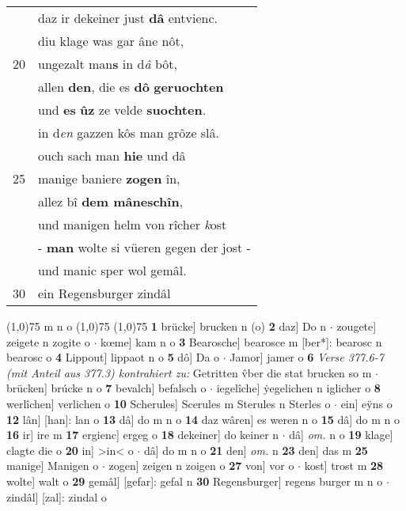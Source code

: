 \documentclass[8pt,a4paper,notitlepage]{article}
\begin{document}
\begin{table}[ht]
\begin{minipage}[t]{0.5\linewidth}
\begin{tabular}{rl}
 & daz ir dekeiner just \textbf{dâ} entvienc.\\ 
 & diu klage was gar âne nôt,\\ 
20 & ungezalt man\textbf{s} in d\textit{â} bôt,\\ 
 & allen \textbf{den}, die es \textbf{dô} \textbf{geruochten}\\ 
 & und \textbf{es} \textbf{ûz} ze velde \textbf{suochten}.\\ 
 & in d\textit{en} gazzen kôs man grôze slâ.\\ 
 & ouch sach man \textbf{hie} und dâ\\ 
25 & manige baniere \textbf{zogen} în,\\ 
 & allez bî \textbf{dem mâneschîn},\\ 
 & und manigen helm von rîcher \textit{k}ost\\ 
 & - \textbf{man} wolte si vüeren gegen der jost -\\ 
 & und manic sper wol gemâl.\\ 
30 & ein Regensburger zindâl\\ 
\end{tabular}
\scriptsize
\line(1,0){75} \newline
m n o \newline
\line(1,0){75} \newline
\newline
\line(1,0){75} \newline
\textbf{1} brücke] brucken n (o) \textbf{2} daz] Do n  $\cdot$ zougete] zeigete n zogite o  $\cdot$ kœme] kam n o \textbf{3} Bearosche] bearosce m [ber*]: bearosc n bearosc o \textbf{4} Lippout] lippaot n o \textbf{5} dô] Da o  $\cdot$ Jamor] jamer o \textbf{6} \textit{Verse 377.6-7 (mit Anteil aus 377.3) kontrahiert zu:} Getritten v̂ber die stat brucken so m   $\cdot$ brücken] brúcke n o \textbf{7} bevalch] befalsch o  $\cdot$ iegelîche] ẏegelichen n iglicher o \textbf{8} werlîchen] verlichen o \textbf{10} Scherules] Scerules m Sterules n Sterles o  $\cdot$ ein] eÿns o \textbf{12} lân] [han]: lan o \textbf{13} dâ] do m n o \textbf{14} daz wâren] es weren n o \textbf{15} dâ] do m n o \textbf{16} ir] ire m \textbf{17} ergienc] ergeg o \textbf{18} dekeiner] do keiner n  $\cdot$ dâ] \textit{om.} n o \textbf{19} klage] clagte die o \textbf{20} in] >in< o  $\cdot$ dâ] do m n o \textbf{21} den] \textit{om.} n \textbf{23} den] das m \textbf{25} manige] Manigen o  $\cdot$ zogen] zeigen n zoigen o \textbf{27} von] vor o  $\cdot$ kost] trost m \textbf{28} wolte] walt o \textbf{29} gemâl] [gefar]: gefal n \textbf{30} Regensburger] regens burger m n o  $\cdot$ zindâl] [zal]: zindal o \newline
\end{minipage}
\end{table}
\end{document}
